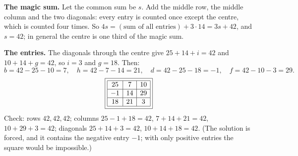 \textbf{The magic sum.} Let the common sum be $s$. Add the middle row, the middle column and the two diagonals: every entry is counted once except the centre, which is counted four times. So $4s=(\text{sum of all entries})+3\cdot14=3s+42$, and $s=42$; in general the centre is one third of the magic sum.

\textbf{The entries.} The diagonals through the centre give $25+14+i=42$ and $10+14+g=42$, so $i=3$ and $g=18$. Then:
\[
b=42-25-10=7,\quad h=42-7-14=21,\quad d=42-25-18=-1,\quad f=42-10-3=29 .
\]
\[
\boxed{\begin{array}{|c|c|c|}\hline 25 & 7 & 10\\ \hline -1 & 14 & 29\\ \hline 18 & 21 & 3\\ \hline\end{array}}
\]
Check: rows $42,42,42$; columns $25-1+18=42$, $7+14+21=42$, $10+29+3=42$; diagonals $25+14+3=42$, $10+14+18=42$. (The solution is forced, and it contains the negative entry $-1$; with only positive entries the square would be impossible.)
